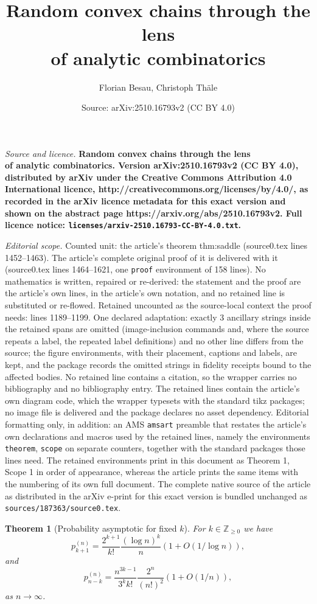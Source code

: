 \documentclass[10pt,a4paper]{amsart}
\title{\bfseries Random convex chains through the lens\\ of analytic combinatorics}
\author{Florian Besau, Christoph Th\"ale}
\date{Source: arXiv:2510.16793v2 (CC BY 4.0)}
\newtheorem{theorem}{Theorem}
\def\ZZ{\mathbb{Z}}
\begin{document}
\maketitle

\noindent\emph{Source and licence.} \bfseries Random convex chains through the lens\\ of analytic combinatorics. Version arXiv:2510.16793v2 (CC BY 4.0), distributed by arXiv under the Creative Commons Attribution 4.0 International licence, http://creativecommons.org/licenses/by/4.0/, as recorded in the arXiv licence metadata for this exact version and shown on the abstract page https://arxiv.org/abs/2510.16793v2. Full licence notice: \texttt{licenses/arxiv-2510.16793-CC-BY-4.0.txt}.\par\smallskip

\noindent\textit{Editorial scope.} Counted unit: the article's theorem thm:saddle (source0.tex lines 1452--1463). The article's complete original proof of it is delivered with it (source0.tex lines 1464--1621, one \texttt{proof} environment of 158 lines). No mathematics is written, repaired or re-derived: the statement and the proof are the article's own lines, in the article's own notation, and no retained line is substituted or re-flowed.  Retained uncounted as the source-local context the proof needs: lines 1189--1199.  One declared adaptation: exactly 3 ancillary strings inside the retained spans are omitted (image-inclusion commands and, where the source repeats a label, the repeated label definitions) and no other line differs from the source; the figure environments, with their placement, captions and labels, are kept, and the package records the omitted strings in fidelity receipts bound to the affected bodies.  No retained line contains a citation, so the wrapper carries no bibliography and no bibliography entry.  The retained lines contain the article's own diagram code, which the wrapper typesets with the standard tikz packages; no image file is delivered and the package declares no asset dependency.  Editorial formatting only, in addition: an AMS \texttt{amsart} preamble that restates the article's own declarations and macros used by the retained lines, namely the environments \texttt{theorem}, \texttt{scope} on separate counters, together with the standard packages those lines need.  The retained environments print in this document as Theorem 1, Scope 1 in order of appearance, whereas the article prints the same items with the numbering of its own full document.  The complete native source of the article as distributed in the arXiv e-print for this exact version is bundled unchanged as \texttt{sources/187363/source0.tex}.
\begin{theorem}[Probability asymptotic for fixed $k$]\label{thm:probab}
    For $k\in\ZZ_{\geq 0}$ we have
    \begin{equation*}
        p_{k+1}^{(n)} = \frac{2^{k+1}}{k!} \frac{(\log n)^{k}}{n} (1+O(1/\log n)),
    \end{equation*}
    and
    \begin{equation}\label{eqn:pnnk}
        p_{n-k}^{(n)} = \frac{n^{3k-1}}{3^k k!} \frac{2^n}{(n!)^2} (1+O(1/n)),
    \end{equation}
    as $n\to\infty$.
\end{theorem}
\end{document}
